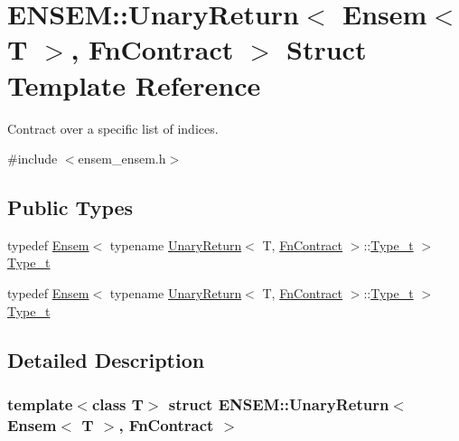 \hypertarget{structENSEM_1_1UnaryReturn_3_01Ensem_3_01T_01_4_00_01FnContract_01_4}{}\section{E\+N\+S\+EM\+:\+:Unary\+Return$<$ Ensem$<$ T $>$, Fn\+Contract $>$ Struct Template Reference}
\label{structENSEM_1_1UnaryReturn_3_01Ensem_3_01T_01_4_00_01FnContract_01_4}


Contract over a specific list of indices.  




{\ttfamily \#include $<$ensem\+\_\+ensem.\+h$>$}

\subsection*{Public Types}
\begin{DoxyCompactItemize}
\item 
typedef \mbox{\hyperlink{classENSEM_1_1Ensem}{Ensem}}$<$ typename \mbox{\hyperlink{structENSEM_1_1UnaryReturn}{Unary\+Return}}$<$ T, \mbox{\hyperlink{structENSEM_1_1FnContract}{Fn\+Contract}} $>$\+::\mbox{\hyperlink{structENSEM_1_1UnaryReturn_3_01Ensem_3_01T_01_4_00_01FnContract_01_4_a3be6c264185868ff0356a15a3b802b83}{Type\+\_\+t}} $>$ \mbox{\hyperlink{structENSEM_1_1UnaryReturn_3_01Ensem_3_01T_01_4_00_01FnContract_01_4_a3be6c264185868ff0356a15a3b802b83}{Type\+\_\+t}}
\item 
typedef \mbox{\hyperlink{classENSEM_1_1Ensem}{Ensem}}$<$ typename \mbox{\hyperlink{structENSEM_1_1UnaryReturn}{Unary\+Return}}$<$ T, \mbox{\hyperlink{structENSEM_1_1FnContract}{Fn\+Contract}} $>$\+::\mbox{\hyperlink{structENSEM_1_1UnaryReturn_3_01Ensem_3_01T_01_4_00_01FnContract_01_4_a3be6c264185868ff0356a15a3b802b83}{Type\+\_\+t}} $>$ \mbox{\hyperlink{structENSEM_1_1UnaryReturn_3_01Ensem_3_01T_01_4_00_01FnContract_01_4_a3be6c264185868ff0356a15a3b802b83}{Type\+\_\+t}}
\end{DoxyCompactItemize}


\subsection{Detailed Description}
\subsubsection*{template$<$class T$>$\newline
struct E\+N\+S\+E\+M\+::\+Unary\+Return$<$ Ensem$<$ T $>$, Fn\+Contract $>$}

